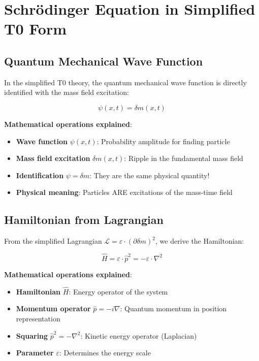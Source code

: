 \documentclass[12pt,a4paper]{article}
\newcommand{\deltam}{\delta m}
\newcommand{\Lag}{\mathcal{L}}
\theoremstyle{definition}
\theoremstyle{remark}
\begin{document}
	\section{Schrödinger Equation in Simplified T0 Form}
	
	\subsection{Quantum Mechanical Wave Function}
	
	In the simplified T0 theory, the quantum mechanical wave function is directly identified with the mass field excitation:
	
	\begin{equation}
		\boxed{\psi(x,t) = \deltam(x,t)}
		\label{eq:wavefunction_identification}
	\end{equation}
	
	\textbf{Mathematical operations explained}:
	\begin{itemize}
		\item \textbf{Wave function} $\psi(x,t)$: Probability amplitude for finding particle
		\item \textbf{Mass field excitation} $\deltam(x,t)$: Ripple in the fundamental mass field
		\item \textbf{Identification} $\psi = \deltam$: They are the same physical quantity!
		\item \textbf{Physical meaning}: Particles ARE excitations of the mass-time field
	\end{itemize}
	
	\subsection{Hamiltonian from Lagrangian}
	
	From the simplified Lagrangian $\Lag = \varepsilon \cdot (\partial \deltam)^2$, we derive the Hamiltonian:
	
	\begin{equation}
		\hat{H} = \varepsilon \cdot \hat{p}^2 = -\varepsilon \cdot \nabla^2
		\label{eq:simplified_hamiltonian}
	\end{equation}
	
	\textbf{Mathematical operations explained}:
	\begin{itemize}
		\item \textbf{Hamiltonian} $\hat{H}$: Energy operator of the system
		\item \textbf{Momentum operator} $\hat{p} = -i\nabla$: Quantum momentum in position representation
		\item \textbf{Squaring} $\hat{p}^2 = -\nabla^2$: Kinetic energy operator (Laplacian)
		\item \textbf{Parameter} $\varepsilon$: Determines the energy scale
	\end{itemize}
	
\end{document}
